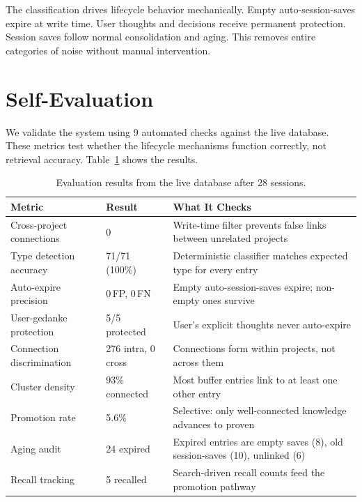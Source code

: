 \documentclass[11pt,a4paper]{article}
\begin{document}
The classification drives lifecycle behavior mechanically.
Empty auto-session-saves expire at write time.
User thoughts and decisions receive permanent protection.
Session saves follow normal consolidation and aging.
This removes entire categories of noise without manual intervention.


\section{Self-Evaluation}

We validate the system using 9 automated checks against the live database.
These metrics test whether the lifecycle mechanisms function correctly, not retrieval accuracy.
Table~\ref{tab:eval} shows the results.

\begin{table}[h]
\centering
\caption{Evaluation results from the live database after 28 sessions.}
\label{tab:eval}
\small
\begin{tabularx}{\textwidth}{llX}
\toprule
\textbf{Metric} & \textbf{Result} & \textbf{What It Checks} \\
\midrule
Cross-project connections & 0 & Write-time filter prevents false links between unrelated projects \\
Type detection accuracy & 71/71 (100\%) & Deterministic classifier matches expected type for every entry \\
Auto-expire precision & 0\,FP, 0\,FN & Empty auto-session-saves expire; non-empty ones survive \\
User-gedanke protection & 5/5 protected & User's explicit thoughts never auto-expire \\
Connection discrimination & 276 intra, 0 cross & Connections form within projects, not across them \\
Cluster density & 93\% connected & Most buffer entries link to at least one other entry \\
Promotion rate & 5.6\% & Selective: only well-connected knowledge advances to proven \\
Aging audit & 24 expired & Expired entries are empty saves (8), old session-saves (10), unlinked (6) \\
Recall tracking & 5 recalled & Search-driven recall counts feed the promotion pathway \\
\bottomrule
\end{tabularx}
\end{table}
\end{document}
